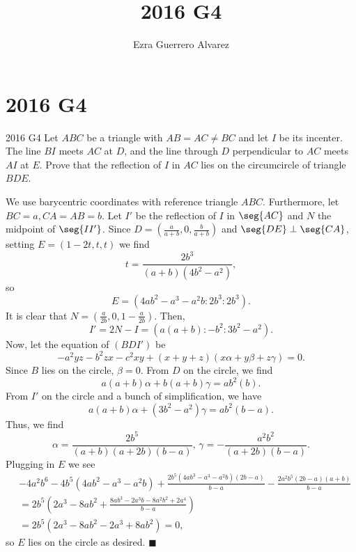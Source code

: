 \documentclass[14pt]{article}
\title{2016 G4}
\author{Ezra Guerrero Alvarez}
\begin{document}
\maketitle
	
\section*{2016 G4}

\begin{statement}{2016 G4}
	Let $ABC$ be a triangle with $AB = AC \neq BC$ and let $I$ be its incenter. The line $BI$ meets $AC$ at $D$, and the line through $D$ perpendicular to $AC$ meets $AI$ at $E$. Prove that the reflection of $I$ in $AC$ lies on the circumcircle of triangle $BDE$.
\end{statement}
We use barycentric coordinates with reference triangle $ABC$. Furthermore, let $BC=a,CA=AB=b$. Let $I'$ be the reflection of $I$ in $\seg{AC}$ and $N$ the midpoint of $\seg{II'}$. Since $D=\left(\frac a{a+b},0,\frac b{a+b}\right)$ and $\seg{DE}\perp\seg{CA}$, setting $E=(1-2t,t,t)$ we find
\[ t=\frac{2b^3}{(a+b)(4b^2-a^2)}, \]
so 
\[ E=(4ab^2-a^3-a^2b:2b^3:2b^3). \]
It is clear that $N=\left(\frac a{2b},0,1-\frac a{2b}\right)$. Then,
\[ I' = 2N-I = (a(a+b):-b^2:3b^2-a^2). \]
Now, let the equation of $(BDI')$ be 
\[ -a^2yz-b^2zx-c^2xy+(x+y+z)(x\alpha+y\beta+z\gamma)=0. \]
Since $B$ lies on the circle, $\beta=0$. From $D$ on the circle, we find
\[ a(a+b)\alpha+b(a+b)\gamma=ab^2(b). \]
From $I'$ on the circle and a bunch of simplification, we have
\[ a(a+b)\alpha+(3b^2-a^2)\gamma=ab^2(b-a). \]
Thus, we find
\[ \alpha = \frac{2b^5}{(a+b)(a+2b)(b-a)},\,\gamma=-\frac{a^2b^2}{(a+2b)(b-a)}. \]
Plugging in $E$ we see
\begin{align*}
	&-4a^2b^6-4b^5(4ab^2-a^3-a^2b)+\frac{2b^5(4ab^3-a^3-a^2b)(2b-a)}{b-a}-\frac{2a^2b^5(2b-a)(a+b)}{b-a}\\
	&=2b^5\left(2a^3-8ab^2+\frac{8ab^3-2a^3b-8a^2b^2+2a^4}{b-a}\right)\\
	&=2b^5(2a^3-8ab^2-2a^3+8ab^2)=0,
\end{align*}
so $E$ lies on the circle as desired. $\blacksquare$
	
\end{document}
